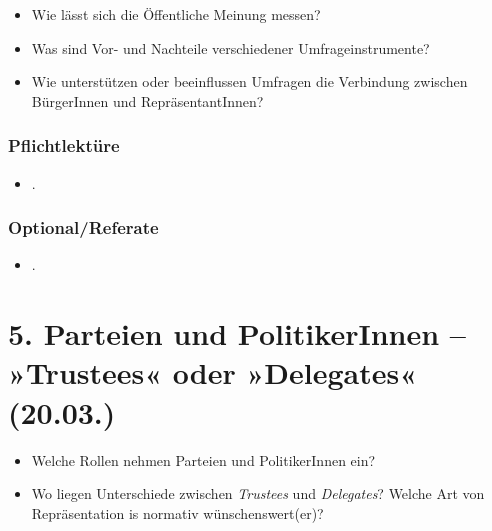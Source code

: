 \documentclass[abstract=on,parskip=full,headings=standardclasses,fontsize=11pt,paper=a4]{scrartcl}
\begin{document}
\begin{itemize}
\renewcommand\labelitemi{--}
\item Wie lässt sich die Öffentliche Meinung messen?
\item Was sind Vor- und Nachteile verschiedener Umfrageinstrumente?
\item Wie unterstützen oder beeinflussen Umfragen die Verbindung zwischen BürgerInnen und RepräsentantInnen?
\end{itemize}


\subsubsection*{Pflichtlektüre}
\begin{itemize}
\item {}.
\end{itemize}


\subsubsection*{Optional/Referate}
\begin{itemize}
\item {}.
\end{itemize}


%


\section{5. Parteien und PolitikerInnen -- »Trustees« oder »Delegates« (20.03.)}

\begin{itemize}
\renewcommand\labelitemi{--}
\item Welche Rollen nehmen Parteien und PolitikerInnen ein?
\item Wo liegen Unterschiede zwischen \textit{Trustees} und \textit{Delegates}? Welche Art von Repräsentation is normativ wünschenswert(er)?
\end{itemize}
\end{document}

